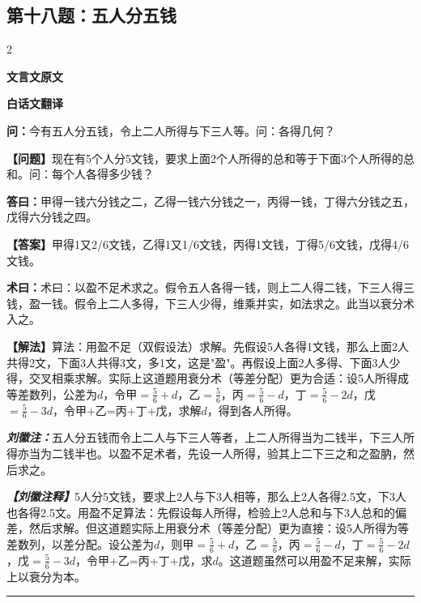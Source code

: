 \documentclass[10pt,a4paper]{article}
\newcommand{\wen}[1]{\textbf{\color{problemcolor}问：}#1\par}
\newcommand{\da}[1]{\textbf{答曰：}#1\par}
\newcommand{\shu}[1]{\textbf{术曰：}#1\par}
\newcommand{\liuhui}[1]{{\color{commentarycolor}\textit{\textbf{刘徽注：}}#1\par}}
\newcommand{\classicalheader}[1]{{\centering\large\bfseries\color{classicalcolor} #1\par\vspace{0.5em}}}
\newcommand{\wenmodern}[1]{\textbf{\color{moderncolor}【问题】}#1\par}
\newcommand{\damodern}[1]{\textbf{【答案】}#1\par}
\newcommand{\shumodern}[1]{\textbf{【解法】}#1\par}
\newcommand{\liuhuimodern}[1]{{\color{commentarycolor}\textit{\textbf{【刘徽注释】}}#1\par}}
\newcommand{\modernheader}[1]{{\centering\large\bfseries\color{moderncolor} #1\par\vspace{0.5em}}}
\newcommand{\problemsec}[1]{\subsection*{#1}}
\begin{document}
\problemsec{第十八题：五人分五钱}
\begin{paracol}{2}
\classicalheader{文言文原文}
\switchcolumn
\modernheader{白话文翻译}
\switchcolumn*

\wen{今有五人分五钱，令上二人所得与下三人等。问：各得几何？}

\switchcolumn

\wenmodern{现在有5个人分5文钱，要求上面2个人所得的总和等于下面3个人所得的总和。问：每个人各得多少钱？}

\switchcolumn*

\da{甲得一钱六分钱之二，乙得一钱六分钱之一，丙得一钱，丁得六分钱之五，戊得六分钱之四。}

\switchcolumn

\damodern{甲得1又2/6文钱，乙得1又1/6文钱，丙得1文钱，丁得5/6文钱，戊得4/6文钱。}

\switchcolumn*

\shu{术曰：以盈不足术求之。假令五人各得一钱，则上二人得二钱，下三人得三钱，盈一钱。假令上二人多得，下三人少得，维乘并实，如法求之。此当以衰分术入之。}

\switchcolumn

\shumodern{算法：用盈不足（双假设法）求解。先假设5人各得1文钱，那么上面2人共得2文，下面3人共得3文，多1文，这是"盈"。再假设上面2人多得、下面3人少得，交叉相乘求解。实际上这道题用衰分术（等差分配）更为合适：设5人所得成等差数列，公差为$d$，令甲$=\frac{5}{6}+d$，乙$=\frac{5}{6}$，丙$=\frac{5}{6}-d$，丁$=\frac{5}{6}-2d$，戊$=\frac{5}{6}-3d$，令甲+乙=丙+丁+戊，求解$d$，得到各人所得。}

\switchcolumn*

\liuhui{五人分五钱而令上二人与下三人等者，上二人所得当为二钱半，下三人所得亦当为二钱半也。以盈不足术者，先设一人所得，验其上二下三之和之盈肭，然后求之。}

\switchcolumn

\liuhuimodern{5人分5文钱，要求上2人与下3人相等，那么上2人各得2.5文，下3人也各得2.5文。用盈不足算法：先假设每人所得，检验上2人总和与下3人总和的偏差，然后求解。但这道题实际上用衰分术（等差分配）更为直接：设5人所得为等差数列，以差分配。设公差为$d$，则甲$=\frac{5}{6}+d$，乙$=\frac{5}{6}$，丙$=\frac{5}{6}-d$，丁$=\frac{5}{6}-2d$，戊$=\frac{5}{6}-3d$，令甲+乙=丙+丁+戊，求$d$。这道题虽然可以用盈不足来解，实际上以衰分为本。}

\end{paracol}

\vspace{0.3cm}
\hrule
\vspace{0.3cm}
\end{document}
